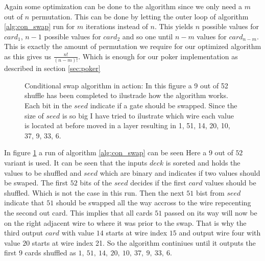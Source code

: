 \documentclass[twoside,11pt,openright]{report}
\begin{document}
\bigskip

Again some optimization can be done to the algorithm since we only need a $m$ out of $n$ permutation. This can be done by letting the outer loop of algorithm \ref{alg:con_swap} run for $m$ iterations instead of $n$. This yields $n$ possible values for $card_1$, $n-1$ possible values for $card_2$ and so one until $n-m$ values for $card_{n-m}$. This is exactly the amount of permutation we require for our optimized algorithm as this gives us $\frac{n!}{(n-m)!}$. Which is enough for our poker implementation as described in section \ref{sec:poker}

\bigskip

\begin{figure}
\centering
\scalebox{1.5}{}
\caption{Conditional swap algorithm in action: In this figure a 9 out of 52 shuffle has been completed to ilustrade how the algorithm works. Each bit in the $seed$ indicate if a gate should be swapped. Since the size of $seed$ is so big I have tried to ilustrate which wire each value is located at before moved in a layer resulting in 1, 51, 14, 20, 10, 37, 9, 33, 6.}
\label{fig:con_swap}
\end{figure}

In figure \ref{fig:con_swap} a run of algorithm \ref{alg:con_swap} can be seen Here a $9$ out of $52$ variant is used. It can be seen that the inputs $deck$ is soreted and holds the values to be shuffled and $seed$ which are binary and indicates if two values should be swaped. The first $52$ bits of the $seed$ decides if the first $card$ values should be shuffled. Which is not the case in this run. Then the next $51$ bist from $seed$ indicate that $51$ should be swapped all the way accross to the wire repecenting the second out card. This implies that all cards $51$ passed on its way will now be on the right adjacent wire to where it was prior to the swap. That is why the third output $card$ with value $14$ starts at wire index $15$ and output wire four with value $20$ starts at wire index 21. So the algorithm continiues until it outputs the first $9$ cards shuffled as $1,~51,~14,~20,~10,~37,~9,~33,~6$.


\end{document}
